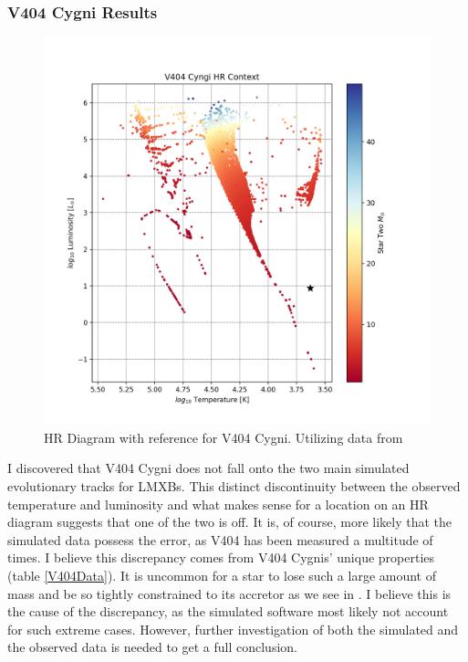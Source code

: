 \documentclass[12pt, a4paper]{article}
\begin{document}
        \subsubsection{V404 Cygni Results} \label{V404Results}
            \begin{figure}[H] 
                \centering
                \includegraphics[scale = .6]{figs/GeneratedFigs/V404_Cygni/V404XBsPopulationHRComp.png}
                \caption{HR Diagram with reference for V404 Cygni. Utilizing data from \parencite{Bartolomeo_2023}}
                \label{V404Context}
            \end{figure}

            I discovered that V404 Cygni does not fall onto the two main simulated evolutionary tracks for LMXBs. This distinct discontinuity between the observed temperature and luminosity and what makes sense for a location on an HR diagram suggests that one of the two is off. It is, of course, more likely that the simulated data possess the error, as V404 has been measured a multitude of times. I believe this discrepancy comes from V404 Cygnis' unique properties (table \ref{V404Data}). It is uncommon for a star to lose such a large amount of mass and be so tightly constrained to its accretor as we see in \cite{Bartolomeo_2023}. I believe this is the cause of the discrepancy, as the simulated software most likely not account for such extreme cases. However, further investigation of both the simulated and the observed data is needed to get a full conclusion.
            
\end{document}
